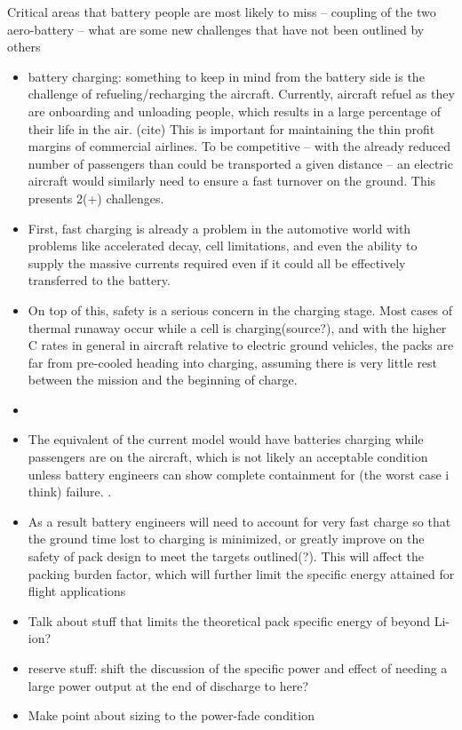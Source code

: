 Critical areas that battery people are most likely to miss -- coupling of the two aero-battery -- what are some new challenges that have not been outlined by others\\
\begin{itemize}
    \item battery charging: something to keep in mind from the battery side is the challenge of refueling/recharging the aircraft. Currently, aircraft refuel as they are onboarding and unloading people, which results in a large percentage of their life in the air. (cite) This is important for maintaining the thin profit margins of commercial airlines. To be competitive -- with the already reduced number of passengers than could be transported a given distance -- an electric aircraft would similarly need to ensure a fast turnover on the ground. This presents 2(+) challenges.
    \item First, fast charging is already a problem in the automotive world with problems like accelerated decay, cell limitations, and even the ability to supply the massive currents required even if it could all be effectively transferred to the battery.
    \item On top of this, safety is a serious concern in the charging stage. Most cases of thermal runaway occur while a cell is charging(source?), and with the higher C rates in general in aircraft relative to electric ground vehicles, the packs are far from pre-cooled heading into charging, assuming there is very little rest between the mission and the beginning of charge. 
    \item {}
    \item The equivalent of the current model would have batteries charging while passengers are on the aircraft, which is not likely an acceptable condition unless battery engineers can show complete containment for (the worst case i think) failure. . 
    \item As a result battery engineers will need to account for very fast charge so that the ground time lost to charging is minimized, or greatly improve on the safety of pack design to meet the targets outlined(?). This will affect the packing burden factor, which will further limit the specific energy attained for flight applications
    \item Talk about stuff that limits the theoretical pack specific energy of beyond Li-ion?
    \item reserve stuff: shift the discussion of the specific power and effect of needing a large power output at the end of discharge to here?
    \item Make point about sizing to the power-fade condition
\end{itemize}  

